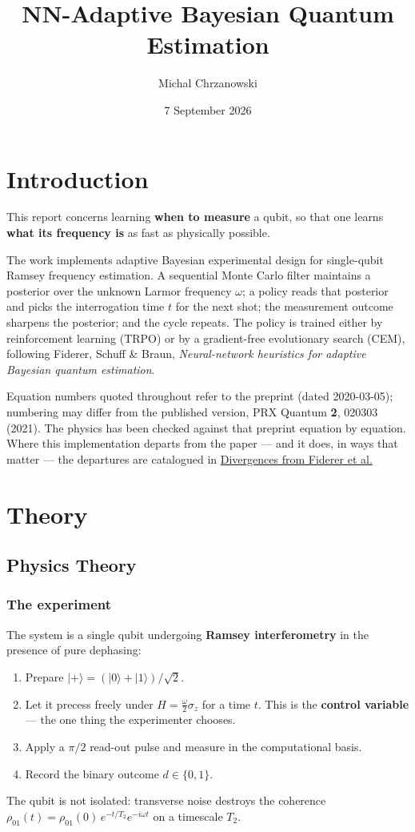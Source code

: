 \documentclass[12pt,a4paper]{article}
\title{NN-Adaptive Bayesian Quantum Estimation}
\author{Michal Chrzanowski}
\date{7 September 2026}
\begin{document}
\maketitle

\section{Introduction}\label{sec:introduction}
This report concerns learning \textbf{when to measure} a qubit, so that one learns \textbf{what its frequency is} as fast as physically possible.

The work implements adaptive Bayesian experimental design for single-qubit Ramsey frequency estimation. A sequential Monte Carlo filter maintains a posterior over the unknown Larmor frequency $\omega$; a policy reads that posterior and picks the interrogation time $t$ for the next shot; the measurement outcome sharpens the posterior; and the cycle repeats. The policy is trained either by reinforcement learning (TRPO) or by a gradient-free evolutionary search (CEM), following Fiderer, Schuff \& Braun, \emph{Neural-network heuristics for adaptive Bayesian quantum estimation}.

Equation numbers quoted throughout refer to the preprint (dated 2020-03-05); numbering may differ from the published version, PRX Quantum \textbf{2}, 020303 (2021). The physics has been checked against that preprint equation by equation. Where this implementation departs from the paper --- and it does, in ways that matter --- the departures are catalogued in \hyperref[sec:divergences-from-fiderer-et-al]{Divergences from Fiderer et al.}

\FloatBarrier
\section{Theory}\label{sec:theory}

\subsection{Physics Theory}\label{sec:physics-theory}

\subsubsection{The experiment}\label{sec:the-experiment}
The system is a single qubit undergoing \textbf{Ramsey interferometry} in the presence of pure dephasing:

\begin{enumerate}
  \item Prepare $|+\rangle = (|0\rangle + |1\rangle)/\sqrt{2}$.
  \item Let it precess freely under $H = \tfrac{\omega}{2}\sigma_z$ for a time $t$. This is the \textbf{control variable} --- the one thing the experimenter chooses.
  \item Apply a $\pi/2$ read-out pulse and measure in the computational basis.
  \item Record the binary outcome $d \in \{0, 1\}$.
\end{enumerate}
The qubit is not isolated: transverse noise destroys the coherence $\rho_{01}(t) = \rho_{01}(0)\,e^{-t/T_2}e^{-i\omega t}$ on a timescale $T_2$.
\end{document}
